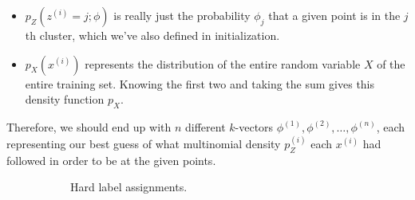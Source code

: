 \begin{definition}[EM Algorithm]
\begin{enumerate}
\begin{itemize}
          \item $p_Z(z^{(i)} = j; \phi)$ is really just the probability $\phi_j$ that a given point is in the $j$th cluster, which we've also defined in initialization.
          \item $p_X(x^{(i)})$ represents the distribution of the entire random variable $X$ of the entire training set. Knowing the first two and taking the sum gives this density function $p_X$.
      \end{itemize}
      Therefore, we should end up with $n$ different $k$-vectors $\phi^{(1)}, \phi^{(2)}, \ldots, \phi^{(n)}$, each representing our best guess of what multinomial density $p_Z^{(i)}$ each $x^{(i)}$ had followed in order to be at the given points.


      \begin{figure}[H]
        \centering
        \begin{subfigure}[b]{0.48\textwidth}
          \centering
          \caption{Hard label assignments.}
          \label{fig:hard-guesses}
        \end{subfigure}
        \hfill 
        \begin{subfigure}[b]{0.48\textwidth}
          \centering
\end{subfigure}
\end{figure}
\end{enumerate}
\end{definition}
